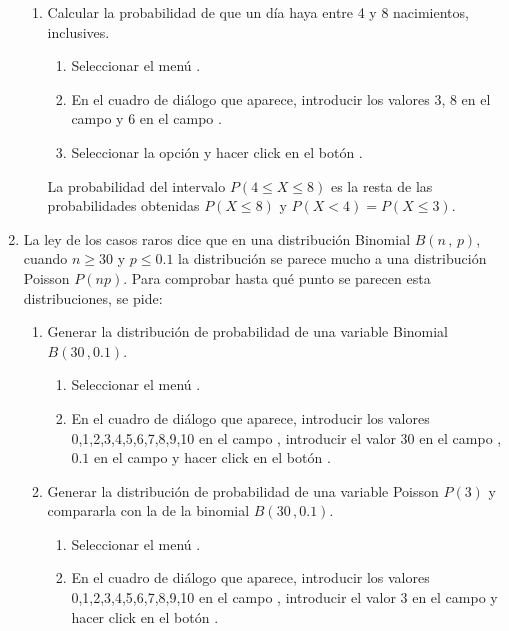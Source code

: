 \begin{enumerate}[leftmargin=*]
\begin{enumerate}
\item Calcular la probabilidad de que un día haya entre 4 y 8 nacimientos, inclusives.
\begin{indicacion}{
\begin{enumerate}
\item Seleccionar el menú .
\item En el cuadro de diálogo que aparece, introducir los valores 3, 8 en el campo  y
6 en el campo .
\item Seleccionar la opción  y hacer click en el botón .
\end{enumerate}
La probabilidad del intervalo $P(4\leq X\leq 8)$ es la resta de las probabilidades obtenidas $P(X\leq 8)$ y $P(X<4)=P(X\leq 3)$.
}
\end{indicacion}
\end{enumerate}


\item La ley de los casos raros dice que en una distribución Binomial $B(n\,,\,p)$, cuando $n\geq 30$ y $p\leq
0.1$ la distribución se parece mucho a una distribución Poisson $P(np)$. 
Para comprobar hasta qué punto se parecen esta distribuciones, se pide:
\begin{enumerate}
\item Generar la distribución de probabilidad de una variable Binomial $B(30\,,0.1)$.
\begin{indicacion}{
\begin{enumerate}
\item Seleccionar el menú .
\item En el cuadro de diálogo que aparece, introducir los valores 0,1,2,3,4,5,6,7,8,9,10 en el campo , introducir el valor 30 en el campo , $0.1$ en el campo  y hacer click en el botón .
\end{enumerate}}
\end{indicacion}

\item Generar la distribución de probabilidad de una variable Poisson $P(3)$ y compararla con la de la binomial
$B(30\,,0.1)$.
\begin{indicacion}{
\begin{enumerate}
\item Seleccionar el menú .
\item En el cuadro de diálogo que aparece, introducir los valores 0,1,2,3,4,5,6,7,8,9,10 en el campo , introducir el valor 3 en el campo  y hacer click en el botón .
\end{enumerate}}
\end{indicacion}


\end{enumerate}
\end{enumerate}
